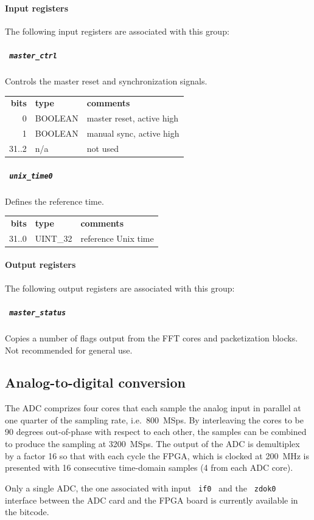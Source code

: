 \documentclass[a4paper,10pt]{article}
\newcommand{\ilcode}[1]{\begingroup
	\setlength{\fboxsep}{1pt}\colorbox{ilcodebg}{\small\tt%
		#1%
	}\endgroup}
\begin{document}
\paragraph{Input registers}
The following input registers are associated with this group:

\subparagraph{\ilcode{master\_ctrl}}
Controls the master reset and synchronization signals.\\
\begin{tabular}{rll}
	{\bf bits} & {\bf type} & {\bf comments}\\
	0 & BOOLEAN & master reset, active high\\
	1 & BOOLEAN & manual sync, active high\\
	31..2 & n/a & not used
\end{tabular}

\subparagraph{\ilcode{unix\_time0}}
Defines the reference time.\\
\begin{tabular}{rll}
	{\bf bits} & {\bf type} & {\bf comments}\\
	31..0 & UINT\_32 & reference Unix time\\
\end{tabular}

\paragraph{Output registers}
The following output registers are associated with this group:

\subparagraph{\ilcode{master\_status}}
Copies a number of flags output from the FFT cores and packetization 
blocks. Not recommended for general use.

\subsection{Analog-to-digital conversion}
\label{sec:gwadc}
The ADC comprizes four cores that each sample the analog input in 
parallel at one quarter of the sampling rate, i.e.\ 800~MSps. By 
interleaving the cores to be 90 degrees out-of-phase with respect to 
each other, the samples can be combined to produce the sampling at 
3200~MSps. The output of the ADC is demultiplex by a factor 16 so that 
with each cycle the FPGA, which is clocked at 200~MHz is presented with 
16 consecutive time-domain samples (4 from each ADC core).

Only a single ADC, the one associated with input \ilcode{if0} and the 
\ilcode{zdok0} interface between the ADC card and the FPGA board is 
currently available in the bitcode.
\end{document}
